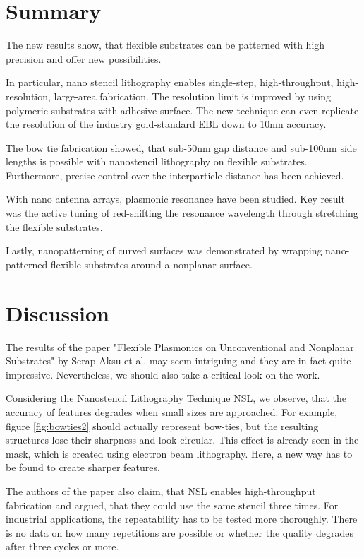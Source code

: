 \documentclass[journal, a4paper]{IEEEtran}
\begin{document}
\section{Summary}
The new results show, that flexible substrates can be patterned with high precision and offer new possibilities. 

In particular, nano stencil lithography enables single-step, high-throughput, high-resolution, large-area fabrication. The resolution limit is improved by using polymeric substrates with adhesive surface. The new technique can even replicate the resolution of the industry gold-standard EBL down to 10nm accuracy. 

The bow tie fabrication showed, that sub-50nm gap distance and sub-100nm side lengths is possible with nanostencil lithography on flexible substrates. Furthermore, precise control over the interparticle distance has been achieved.

With nano antenna arrays, plasmonic resonance have been studied. Key result was the active tuning of red-shifting the resonance wavelength through stretching the flexible substrates.

Lastly, nanopatterning of curved surfaces was demonstrated by wrapping nano-patterned flexible substrates around a nonplanar surface. 


\section{Discussion}
The results of the paper "Flexible Plasmonics on Unconventional and Nonplanar Substrates" by Serap Aksu et al. may seem intriguing and they are in fact quite impressive. Nevertheless, we should also take a critical look on the work. 

Considering the Nanostencil Lithography Technique NSL, we observe, that the accuracy of features degrades when small sizes are approached. For example, figure \ref{fig:bowties2} should actually represent bow-ties, but the resulting structures lose their sharpness and look circular. This effect is already seen in the mask, which is created using electron beam lithography.  Here, a new way has to be found to create sharper features. 

The authors of the paper also claim, that NSL enables high-throughput fabrication and argued, that they could use the same stencil three times. For industrial applications, the repeatability has to be tested more thoroughly. There is no data on how many repetitions are possible or whether the quality degrades after three cycles or more.
\end{document}
